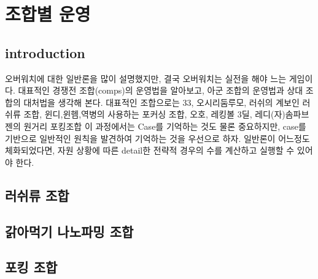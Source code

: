 \chapter{조합별 운영}{\label{sec:comp}}
\section{introduction}
오버워치에 대한 일반론을 많이 설명했지만, 결국 오버워치는 실전을 해야 느는 게임이다. 대표적인 경쟁전 조합(comps)의 운영법을 알아보고, 아군 조합의 운영법과 상대 조합의 대처법을 생각해 본다. 대표적인 조합으로는 33, 오시리둠루모, 러쉬의 계보인 러쉬류 조합, 윈디,윈헴,역병의 사용하는 포커싱 조합,
오호, 레킹볼 3딜, 레디(자)솜파브젠의 원거리 포킹조합 
이 과정에서는 Case를 기억하는 것도 물론 중요하지만, case를 기반으로 일반적인 원칙을 발견하여 기억하는 것을 우선으로 하자. 일반론이 어느정도 체화되었다면, 자원 상황에 따른 detail한 전략적 경우의 수를 계산하고 실행할 수 있어야 한다.
\section{러쉬류 조합}




\section{갉아먹기 나노파밍 조합}

\section{포킹 조합}


